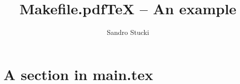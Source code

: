 \documentclass{article}
\title{Makefile.pdfTeX -- An example}
\author{Sandro Stucki}
\begin{document}
\maketitle

\section{A section in main.tex}





\end{document}
